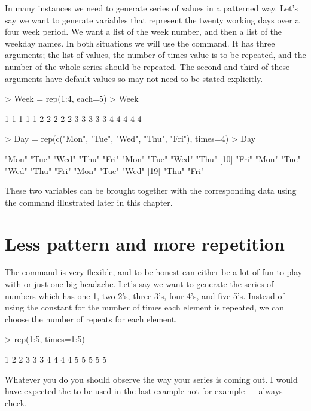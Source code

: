 In many instances we need to generate series of values in a patterned way. Let's say we want to generate variables that represent the twenty working days over a four week period. We want a list of the week number, and then a list of the weekday names. In both situations we will use the  command. It has three arguments; the list of values, the number of times  value is to be repeated, and the number of  the whole series should be repeated.  
The second and third of these arguments have default values so may not need to be stated explicitly. 
\begin{Schunk}
\begin{Sinput}
> Week = rep(1:4, each=5) 
> Week 
\end{Sinput}
\begin{Soutput}
 [1] 1 1 1 1 1 2 2 2 2 2 3 3 3 3 3 4 4 4 4 4
\end{Soutput}
\begin{Sinput}
> Day = rep(c("Mon", "Tue", "Wed", "Thu", "Fri"), times=4) 
> Day 
\end{Sinput}
\begin{Soutput}
 [1] "Mon" "Tue" "Wed" "Thu" "Fri" "Mon" "Tue" "Wed" "Thu"
[10] "Fri" "Mon" "Tue" "Wed" "Thu" "Fri" "Mon" "Tue" "Wed"
[19] "Thu" "Fri"
\end{Soutput}
\end{Schunk}
These two variables can be brought together with the corresponding data using the  command illustrated later in this chapter. 
 
\section{Less pattern and more repetition} 
 
The  command is very flexible, and to be honest can either be a lot of fun to play with or just one big headache. Let's say we want to generate the series of numbers which has one 1, two 2's, three 3's, four 4's, and five 5's. Instead of using the constant for the number of times each element is repeated, we can choose the number of repeats for each element. 
\begin{Schunk}
\begin{Sinput}
> rep(1:5, times=1:5) 
\end{Sinput}
\begin{Soutput}
 [1] 1 2 2 3 3 3 4 4 4 4 5 5 5 5 5
\end{Soutput}
\end{Schunk}
Whatever you do you should observe the way your series is coming out. I would have expected the  to be used in the last example not  for example --- always check. 
 
